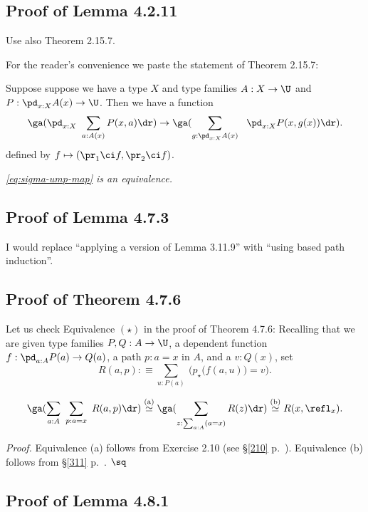 \documentclass[12pt]{article}
\begin{document}

\subsection{Proof of Lemma 4.2.11}\label{4211}

Use also Theorem 2.15.7. 

For the reader's convenience we paste the statement of Theorem 2.15.7:

Suppose suppose we have a type $X$ and type families $A:X\to\U$ and $P:\pd_{x:X}A(x)\to\U$. Then we have a function
\begin{equation}\label{eq:sigma-ump-map}
\ga(\pd_{x:X}\ \sum_{a:A(x)}P(x,a)\dr)\to
\ga(\sum_{g:\pd_{x:X}A(x)}\ \ \pd_{x:X}P(x,g(x))\dr).
\end{equation}
defined by $f\mapsto(\pr_1\ci f,\pr_2\ci f)$.

\nn{} \emph{\eqref{eq:sigma-ump-map} is an equivalence.}


\subsection{Proof of Lemma 4.7.3}

I would replace ``applying a version of Lemma 3.11.9'' with ``using based path induction''.


\subsection{Proof of Theorem 4.7.6}

Let us check Equivalence $(\star)$ in the proof of Theorem 4.7.6: Recalling that we are given type families $P,Q:A\to\U$, a dependent function $f:\pd_{a:A}P(a)\to Q(a)$, a path $p:a=x$ in $A$, and a $v:Q(x)$, set 
$$
R(a,p):\equiv\sum_{u:P(a)}\ \Big(p_\star\big(f(a,u)\big)=v\Big).
$$ 

\nn{}
$$
\ga(\sum_{a:A}\ \sum_{p:a=x}\ R(a,p)\dr)\overset{(\text a)}{\simeq}
\ga(\sum_{z:\sum_{a:A}(a=x)}R(z)\dr)\overset{(\text b)}{\simeq}
R(x,\refl_x).
$$

\nn\emph{Proof.} Equivalence (a) follows from Exercise 2.10 (see \S\ref{210} p.~\pageref{210}). Equivalence (b) follows from \S\ref{311} p.~\pageref{311}. $\sq$


\subsection{Proof of Lemma 4.8.1}\label{481}
\end{document}
